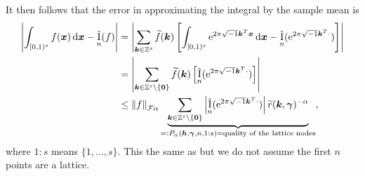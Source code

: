 \documentclass{iitthesis-au} %
\newcommand{\tr}{\widetilde{r}}
\newcommand{\appxintn}{\appxint_n}
\DeclareMathOperator{\appxint}{\hat{I}}
\newcommand{\onetos}{1\!:\!s}
\begin{document}
It then follows that the error in approximating the integral by the sample mean is
\begin{align} \label{eq:wcerrPalpha}
\nonumber
\abs{\int_{[0,1)^{s}} f(\vx) \, \dif \vx - \appxint_n(f)} &
= \abs{\sum_{\vk \in \integers^{s}} \tf(\vk) \left[\int_{[0,1)^{s}} \me^{2 \pi \sqrt{-1} \vk^T \vx} \, \dif \vx - \appxintn(\me^{2 \pi \sqrt{-1} \vk^T \cdot})\right]} \\
\nonumber
& = \abs{\sum_{\vk \in \integers^s \setminus\{\vzero\}} \tf(\vk) \left[ \appxintn(\me^{2 \pi \sqrt{-1} \vk^T \cdot})\right]} \\
& \le \norm[\cf{\alpha}]{f} \underbrace{\sum_{\vk \in \integers^s \setminus\{\vzero\}} \abs{\appxint_n(\me^{2 \pi \sqrt{-1} \vk^T \cdot})}\tr(\vk,\vgamma)^{-\alpha}}_{=: P_\alpha(\vh,\vgamma,n,1:s) = \text{quality of the lattice nodes}},  %
\end{align}
where $\onetos$ means $\{1, \ldots, s\}$.
This the same as \cite[(4)]{HicNie03a} but we do not assume the first $n$ points are a lattice. 
\end{document}
